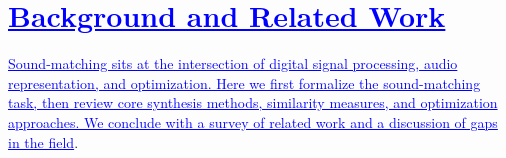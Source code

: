 \documentclass[lettersize,journal]{IEEEtran}
\renewcommand{\DIFadd}[1]{\textcolor{blue}{\uline{#1}}}
\providecommand{\DIFadd}[1]{{\protect\color{blue}\uwave{#1}}} %
\providecommand{\DIFaddend}{} %
\DeclareRobustCommand{\DIFaddend}{\DIFOaddend \let\includegraphics\DIFOincludegraphics} %
\begin{document}


\section{\DIFadd{Background and Related Work}}
\label{sec:background_related}
 \DIFadd{Sound-matching sits at the intersection of digital signal processing, audio representation, and optimization. Here we first formalize the sound-matching task, then review core synthesis methods, similarity measures, and optimization approaches. 
We conclude with a survey of related work and a discussion of gaps in the field}\DIFaddend . 
\end{document}
